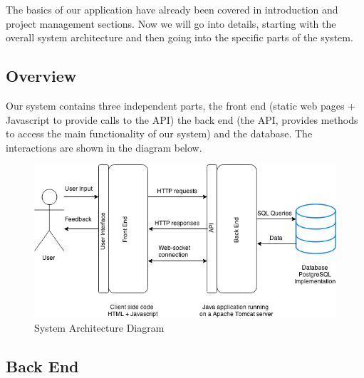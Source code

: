 \documentclass[10pt,a4paper]{article}
\begin{document}
The basics of our application have already been covered in introduction and project management sections. Now we will go into details, starting with the overall system architecture and then going into the specific parts of the system.

\subsection{Overview}

\noindent Our system contains three independent parts, the front end (static web pages + Javascript to provide calls to the API) the back end (the API, provides methods to access the main functionality of our system) and the database. The interactions are shown in the diagram below.

\begin{figure}[H]
\centerline{\includegraphics[scale=0.58,trim=0 0 100 0]{sysarch}}
\caption{System Architecture Diagram}
\end{figure}    


\subsection{Back End}
\end{document}

